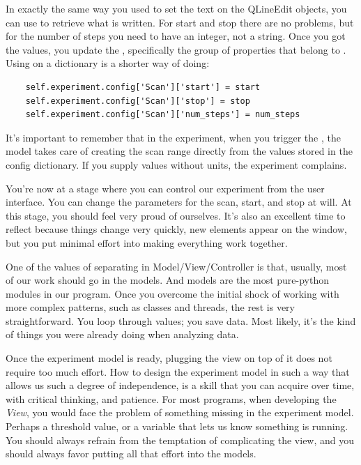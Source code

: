 In exactly the same way you used  to set the text on the QLineEdit objects, you can use  to retrieve what is written. For start and stop there are no problems, but for the number of steps you need to have an integer, not a string. Once you got the values, you update the , specifically the group of properties that belong to . Using  on a dictionary is a shorter way of doing:

\begin{verbatim}
    self.experiment.config['Scan']['start'] = start
    self.experiment.config['Scan']['stop'] = stop
    self.experiment.config['Scan']['num_steps'] = num_steps
\end{verbatim}

It's important to remember that in the experiment, when you trigger the , the model takes care of creating the scan range directly from the values stored in the config dictionary. If you supply values without units, the experiment complains.



You're now at a stage where you can control our experiment from the user interface. You can change the parameters for the scan, start, and stop at will. At this stage, you should feel very proud of ourselves. It's also an excellent time to reflect because things change very quickly, new elements appear on the window, but you put minimal effort into making everything work together.

One of the values of separating in Model/View/Controller is that, usually, most of our work should go in the models. And models are the most pure-python modules in our program. Once you overcome the initial shock of working with more complex patterns, such as classes and threads, the rest is very straightforward. You loop through values; you save data. Most likely, it's the kind of things you were already doing when analyzing data.

Once the experiment model is ready, plugging the view on top of it does not require too much effort. How to design the experiment model in such a way that allows us such a degree of independence, is a skill that you can acquire over time, with critical thinking, and patience. For most programs, when developing the \emph{View}, you would face the problem of something missing in the experiment model. Perhaps a threshold value, or a variable that lets us know something is running. You should always refrain from the temptation of complicating the view, and you should always favor putting all that effort into the models.


